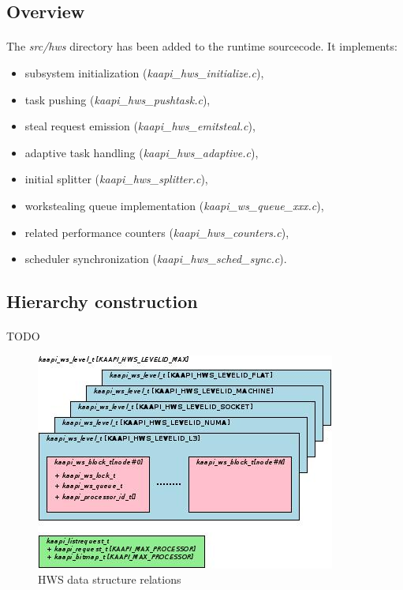 \documentclass[a4paper, 11pt]{article}
\begin{document}
\subsection{Overview}
\paragraph{}
The \textit{src/hws} directory has been added to the runtime sourcecode. It implements:
\begin{itemize}
\item subsystem initialization (\textit{kaapi\_hws\_initialize.c}),
\item task pushing (\textit{kaapi\_hws\_pushtask.c}),
\item steal request emission (\textit{kaapi\_hws\_emitsteal.c}),
\item adaptive task handling (\textit{kaapi\_hws\_adaptive.c}),
\item initial splitter (\textit{kaapi\_hws\_splitter.c}),
\item workstealing queue implementation (\textit{kaapi\_ws\_queue\_xxx.c}),
\item related performance counters (\textit{kaapi\_hws\_counters.c}),
\item scheduler synchronization (\textit{kaapi\_hws\_sched\_sync.c}).
\end{itemize}

\subsection{Hierarchy construction}
\paragraph{}
TODO
\begin{figure}[!hb]
\centering
\includegraphics[keepaspectratio=true, scale=0.6]{../dia/impl/main.jpeg}
\caption{HWS data structure relations}
\label{hws_impl}
\end{figure}
\end{document}
